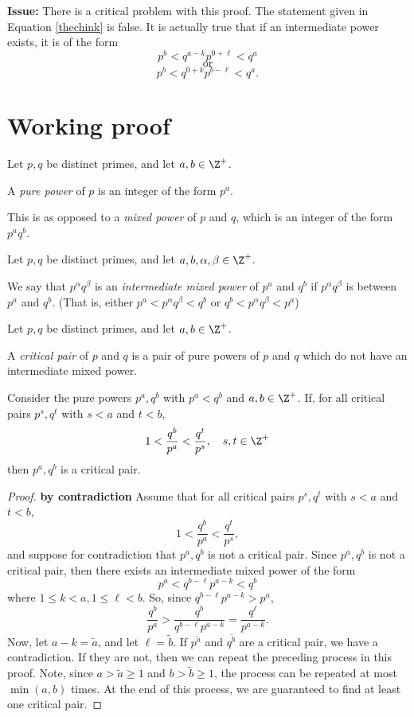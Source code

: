 \documentclass[a5paper]{article}
\begin{document}
\noindent \textbf{Issue: }There is a critical problem with this proof. The statement given in Equation \ref{thechink} is false. It is actually true that if an intermediate power exists, it is of the form 
$$p^b < q^{a-k}p^{0+\ell} < q^a$$
$$\text{or}$$
$$p^b < q^{0+k}p^{b-\ell} < q^a.$$

\pagebreak
\section{Working proof}

\begin{definition*}Let $p,q$ be distinct primes, and let $a,b \in \Z^+$. 

A \emph{pure power} of $p$ is an integer of the form $p^a$. 

This is as opposed to a \emph{mixed power} of $p$ and $q$, which is an integer of the form $p^a q^b$.
\end{definition*}

\begin{definition*}Let $p,q$ be distinct primes, and let $a,b,\alpha,\beta \in \Z^+$. 

We say that $p^\alpha q^\beta$ is an \emph{intermediate mixed power} of $p^a$ and $q^b$ if $p^\alpha q^\beta$ is between $p^a$ and $q^b$. (That is, either $p^a < p^\alpha q^\beta < q^b$ or $q^b < p^\alpha q^\beta < p^a$)
\end{definition*}

\begin{definition*}Let $p,q$ be distinct primes, and let $a,b \in \Z^+$. 

A \emph{critical pair} of $p$ and $q$ is a pair of pure powers of $p$ and $q$ which do not have an intermediate mixed power. 
\end{definition*}

\begin{theorem}
Consider the pure powers $p^a, q^b$ with $p^a < q^b$ and $a,b \in \Z^+$. If, for all critical pairs $p^s,q^t$ with $s<a$ and $t<b$, 
$$1<\frac{q^b}{p^a}<\frac{q^t}{p^s}, \quad s,t \in \Z^+$$
then $p^a, q^b$ is a critical pair. 
\end{theorem}

\begin{proof} \textbf{by contradiction}
Assume that for all critical pairs $p^s,q^t$ with $s<a$ and $t<b$, 
$$1<\frac{q^b}{p^a}<\frac{q^t}{p^s},$$ and suppose for contradiction that $p^a, q^b$ is not a critical pair. Since $p^a, q^b$ is not a critical pair, then there exists an intermediate mixed power of the form
$$p^a < q^{b-\ell}p^{a-k} < q^b$$
where $1\leq k < a, 1\leq \ell < b$. So, since $q^{b-\ell}p^{a-k} > p^a$, 
\[\frac{q^b}{p^a}>\frac{q^b}{q^{b-\ell}p^{a-k}}=\frac{q^\ell}{p^{a-k}}.\]
Now, let $a - k=\tilde{a}$, and let $\ell=\tilde{b}$. If $p^{\tilde{a}}$ and $q^{\tilde{b}}$ are a critical pair, we have a contradiction. If they are not, then we can repeat the preceding process in this proof. Note, since $a>\tilde{a}\geq 1$ and $b>\tilde{b}\geq 1$, the process can be repeated at most $\min(a,b)$ times. At the end of this process, we are guaranteed to find at least one critical pair.
\end{proof}
\end{document}
